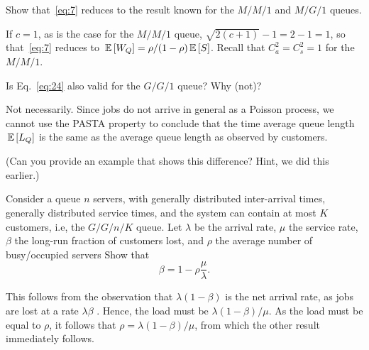 \begin{question}
  Show that~\eqref{eq:7} reduces to the result known for the $M/M/1$ and $M/G/1$ queues. 
  \begin{solution}
    If $c=1$, as is the case for the $M/M/1$ queue, $\sqrt{2(c+1)} - 1=2-1=1$, so that~\eqref{eq:7} reduces to $\,\mathbb{E}\left[W_Q\right] = \rho/(1-\rho) \,\mathbb{E}\left[S\right]$. Recall that $C_a^2=C_s^2=1$ for the $M/M/1$. 
  \end{solution}
\end{question}


\begin{question}
  Is Eq.~\eqref{eq:24} also valid for the $G/G/1$ queue? Why (not)?
  \begin{solution}
    Not necessarily. Since jobs do not arrive in general as a Poisson
    process, we cannot use the PASTA property to conclude that the
    time average queue length $\,\mathbb{E}\left[L_Q\right]$ is the same as the average
    queue length as observed by customers.

(Can you provide an example that shows this difference?
    Hint, we did this earlier.)
  \end{solution}
\end{question}



\begin{question}
  Consider a queue $n$ servers, with generally distributed
  inter-arrival times, generally distributed service times, and the
  system can contain at most $K$ customers, i.e, the $G/G/n/K$ queue.
  Let $\lambda$ be the arrival rate, $\mu$ the service rate, $\beta$
  the long-run fraction of customers lost, and $\rho$  the average
  number of busy/occupied servers
  Show that 
  \begin{equation*}
    \beta = 1 - \rho\frac{\mu}{\lambda}.
  \end{equation*}
\begin{solution}
  This follows from the observation that $\lambda(1-\beta)$ is the net
  arrival rate, as jobs are lost at a rate $\lambda\beta$ . Hence, the
  load must be $\lambda(1-\beta)/\mu$. As the load must be equal to
  $\rho$, it follows that $\rho = \lambda(1-\beta)/\mu$, from which the
  other result immediately follows.
\end{solution}
\end{question}

